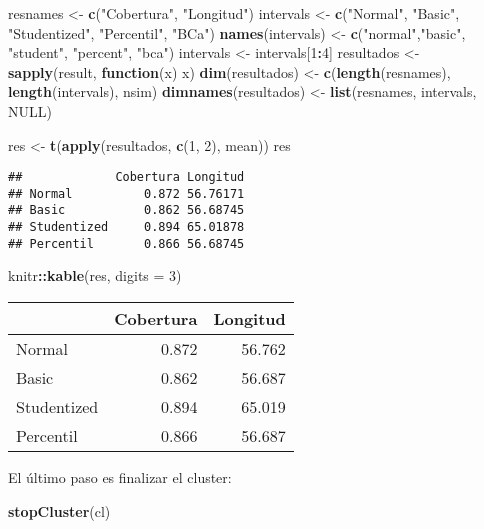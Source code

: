 \documentclass[]{book}
\newenvironment{Shaded}{\begin{snugshade}}{\end{snugshade}}
\newcommand{\KeywordTok}[1]{\textcolor[rgb]{0.13,0.29,0.53}{\textbf{#1}}}
\newcommand{\DataTypeTok}[1]{\textcolor[rgb]{0.13,0.29,0.53}{#1}}
\newcommand{\DecValTok}[1]{\textcolor[rgb]{0.00,0.00,0.81}{#1}}
\newcommand{\StringTok}[1]{\textcolor[rgb]{0.31,0.60,0.02}{#1}}
\newcommand{\OtherTok}[1]{\textcolor[rgb]{0.56,0.35,0.01}{#1}}
\newcommand{\ControlFlowTok}[1]{\textcolor[rgb]{0.13,0.29,0.53}{\textbf{#1}}}
\newcommand{\OperatorTok}[1]{\textcolor[rgb]{0.81,0.36,0.00}{\textbf{#1}}}
\newcommand{\NormalTok}[1]{#1}
\theoremstyle{break}
\theoremstyle{definition}
\theoremstyle{definition}
\theoremstyle{definition}
\theoremstyle{remark}
\begin{document}
\begin{Shaded}
\begin{Highlighting}[]
\NormalTok{resnames <-}\StringTok{ }\KeywordTok{c}\NormalTok{(}\StringTok{"Cobertura"}\NormalTok{, }\StringTok{"Longitud"}\NormalTok{)}
\NormalTok{intervals <-}\StringTok{ }\KeywordTok{c}\NormalTok{(}\StringTok{"Normal"}\NormalTok{, }\StringTok{"Basic"}\NormalTok{, }\StringTok{"Studentized"}\NormalTok{, }\StringTok{"Percentil"}\NormalTok{, }\StringTok{"BCa"}\NormalTok{)}
\KeywordTok{names}\NormalTok{(intervals) <-}\StringTok{ }\KeywordTok{c}\NormalTok{(}\StringTok{"normal"}\NormalTok{,}\StringTok{"basic"}\NormalTok{, }\StringTok{"student"}\NormalTok{, }\StringTok{"percent"}\NormalTok{, }\StringTok{"bca"}\NormalTok{)}
\NormalTok{intervals <-}\StringTok{ }\NormalTok{intervals[}\DecValTok{1}\OperatorTok{:}\DecValTok{4}\NormalTok{]}
\NormalTok{resultados <-}\StringTok{ }\KeywordTok{sapply}\NormalTok{(result, }\ControlFlowTok{function}\NormalTok{(x) x)}
\KeywordTok{dim}\NormalTok{(resultados) <-}\StringTok{ }\KeywordTok{c}\NormalTok{(}\KeywordTok{length}\NormalTok{(resnames), }\KeywordTok{length}\NormalTok{(intervals), nsim)}
\KeywordTok{dimnames}\NormalTok{(resultados) <-}\StringTok{ }\KeywordTok{list}\NormalTok{(resnames, intervals, }\OtherTok{NULL}\NormalTok{)}

\NormalTok{res <-}\StringTok{ }\KeywordTok{t}\NormalTok{(}\KeywordTok{apply}\NormalTok{(resultados, }\KeywordTok{c}\NormalTok{(}\DecValTok{1}\NormalTok{, }\DecValTok{2}\NormalTok{), mean))}
\NormalTok{res}
\end{Highlighting}
\end{Shaded}

\begin{verbatim}
##             Cobertura Longitud
## Normal          0.872 56.76171
## Basic           0.862 56.68745
## Studentized     0.894 65.01878
## Percentil       0.866 56.68745
\end{verbatim}

\begin{Shaded}
\begin{Highlighting}[]
\NormalTok{knitr}\OperatorTok{::}\KeywordTok{kable}\NormalTok{(res, }\DataTypeTok{digits =} \DecValTok{3}\NormalTok{)}
\end{Highlighting}
\end{Shaded}

\begin{tabular}{l|r|r}
\hline
  & Cobertura & Longitud\\
\hline
Normal & 0.872 & 56.762\\
\hline
Basic & 0.862 & 56.687\\
\hline
Studentized & 0.894 & 65.019\\
\hline
Percentil & 0.866 & 56.687\\
\hline
\end{tabular}

El último paso es finalizar el cluster:

\begin{Shaded}
\begin{Highlighting}[]
\KeywordTok{stopCluster}\NormalTok{(cl)}
\end{Highlighting}
\end{Shaded}


\end{document}
